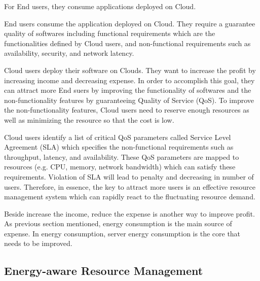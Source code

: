 For End users, they consume applications deployed on Cloud. 




End users consume the application deployed on Cloud. They require a guarantee quality of softwares including functional requirements which are the functionalities defined by Cloud users, and non-functional requirements such as availability, security, and network latency.

Cloud users deploy their software on Clouds. They want to increase the profit by increasing income and decreasing expense. In order to accomplish this goal, they can attract more End suers by improving the functionality of softwares and the non-functionality features by guaranteeing Quality of Service (QoS). To improve the non-functionality features, Cloud users need to reserve enough resources as well as minimizing the resource so that the cost is low.


Cloud users identify a list of critical QoS parameters called Service Level Agreement (SLA) which specifies the non-functional requirements such as throughput, latency, and availability. These QoS parameters are mapped to resources (e.g. CPU, memory, network bandwidth) which can satisfy these requirements. Violation of SLA will lead to penalty and decreasing in number of users. Therefore, in essence, the key to attract more users is an effective resource management system which can rapidly react to the fluctuating resource demand. 

Beside increase the income, reduce the expense is another way to improve profit. As previous section mentioned, energy consumption is the main source of expense. In energy consumption, server energy consumption is the core that needs to be improved. 

\subsection{Energy-aware Resource Management}
